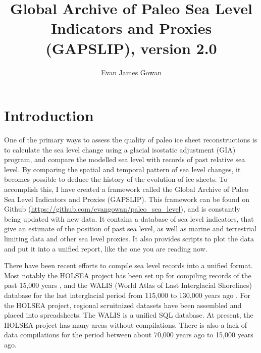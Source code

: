 \documentclass[a4paper,12pt]{article}
\begin{document}
\title{Global Archive of Paleo Sea Level Indicators and Proxies (GAPSLIP), version 2.0}

\author{Evan James Gowan}
    
\date{}

\maketitle



\newpage

\tableofcontents

\newpage



\section{Introduction}

One of the primary ways to assess the quality of paleo ice sheet reconstructions is to calculate the sea level change using a glacial isostatic adjustment (GIA) program, and compare the modelled sea level with records of past relative sea level. By comparing the spatial and temporal pattern of sea level changes, it becomes possible to deduce the history of the evolution of ice sheets. To accomplish this, I have created a framework called the Global Archive of Paleo Sea Level Indicators and Proxies (GAPSLIP). This framework can be found on Github (\url{https://github.com/evangowan/paleo_sea_level}), and is constantly being updated with new data. It contains a database of sea level indicators, that give an estimate of the position of past sea level, as well as marine and terrestrial limiting data and other sea level proxies. It also provides scripts to plot the data and put it into a unified report, like the one you are reading now.

There have been recent efforts to compile sea level records into a unified format. Most notably the HOLSEA project has been set up for compiling records of the past 15,000 years \citep{KhanEtal2019},  and the WALIS (World Atlas of Last Interglacial Shorelines) database for the last interglacial period from 115,000 to 130,000 years ago \citep{RovereEtal2023}. For the HOLSEA project, regional scruitnized datasets have been assembled and placed into spreadsheets. The WALIS is a unified SQL database. At present, the HOLSEA project has many areas without compilations. There is also a lack of data compilations for the period between about 70,000 years ago to 15,000 years ago.
\end{document}
